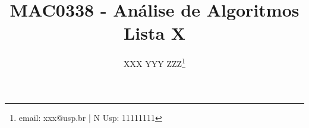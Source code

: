 \title{MAC0338 - Análise de Algoritmos \\ \vspace{10px} \LARGE{Lista X}}
\author{XXX YYY ZZZ\footnote{email: xxx@usp.br | N Usp: 11111111}}
\maketitle
